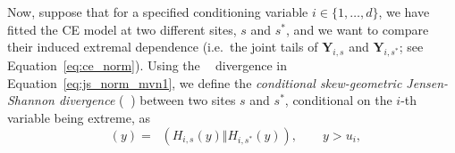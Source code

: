 \documentclass[12pt,compact]{article}
\newcommand{\JSGa}{\mathop{\mathrm{JS}^{\mathrm{G}_{\lambda}}}\nolimits}
\newcommand{\cJSGa}[1]{\mathop{\mathrm{cJS}_{i, #1}^{\mathrm{G}_{\lambda}}}\nolimits}
\begin{document}
Now, suppose that for a specified conditioning variable $i \in \{1, \ldots, d\}$, we have fitted the CE model at two different sites, $s$ and $s^*$, and we want to compare their induced extremal dependence (i.e.\ the joint tails of $\boldsymbol{Y}_{i, s}$ and $\boldsymbol{Y}_{i, s^*}$; see Equation~\eqref{eq:ce_norm}). 
Using the $\JSGa{}$ divergence in Equation~\eqref{eq:js_norm_mvn1}, we define the \textit{conditional skew-geometric Jensen-Shannon divergence} ($\cJSGa{s, s^*}$) between two sites $s$ and $s^*$, conditional on the $i$-th variable being extreme, as
\begin{equation}\label{eq:cjsga}
  \cJSGa{s, s^*}(y) = \JSGa{}\left(H_{i, s}(y) \Vert H_{i, s^*}(y)\right),\qquad y > u_i,
\end{equation}
\end{document}
